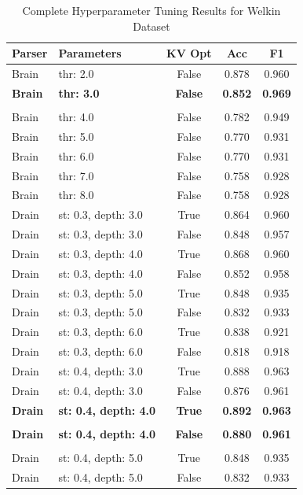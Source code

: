 \begin{small}
\begin{longtable}{llccc}
\caption{Complete Hyperparameter Tuning Results for Welkin Dataset} \label{app:tuning_data} \\
\toprule
\textbf{Parser} & \textbf{Parameters} & \textbf{KV Opt} & \textbf{Acc} & \textbf{F1} \\ \midrule
\endhead
\bottomrule
\endfoot
Brain & thr: 2.0 & False & 0.878 & 0.960 \\
\textbf{Brain} & \textbf{thr: 3.0} & \textbf{False} & \textbf{0.852} & \textbf{0.969} \\\\
Brain & thr: 4.0 & False & 0.782 & 0.949 \\
Brain & thr: 5.0 & False & 0.770 & 0.931 \\
Brain & thr: 6.0 & False & 0.770 & 0.931 \\
Brain & thr: 7.0 & False & 0.758 & 0.928 \\
Brain & thr: 8.0 & False & 0.758 & 0.928 \\
\midrule
Drain & st: 0.3, depth: 3.0 & True & 0.864 & 0.960 \\
Drain & st: 0.3, depth: 3.0 & False & 0.848 & 0.957 \\
Drain & st: 0.3, depth: 4.0 & True & 0.868 & 0.960 \\
Drain & st: 0.3, depth: 4.0 & False & 0.852 & 0.958 \\
Drain & st: 0.3, depth: 5.0 & True & 0.848 & 0.935 \\
Drain & st: 0.3, depth: 5.0 & False & 0.832 & 0.933 \\
Drain & st: 0.3, depth: 6.0 & True & 0.838 & 0.921 \\
Drain & st: 0.3, depth: 6.0 & False & 0.818 & 0.918 \\
Drain & st: 0.4, depth: 3.0 & True & 0.888 & 0.963 \\
Drain & st: 0.4, depth: 3.0 & False & 0.876 & 0.961 \\
\textbf{Drain} & \textbf{st: 0.4, depth: 4.0} & \textbf{True} & \textbf{0.892} & \textbf{0.963} \\\\
\textbf{Drain} & \textbf{st: 0.4, depth: 4.0} & \textbf{False} & \textbf{0.880} & \textbf{0.961} \\\\
Drain & st: 0.4, depth: 5.0 & True & 0.848 & 0.935 \\
Drain & st: 0.4, depth: 5.0 & False & 0.832 & 0.933 \\

\end{longtable}
\end{small}
